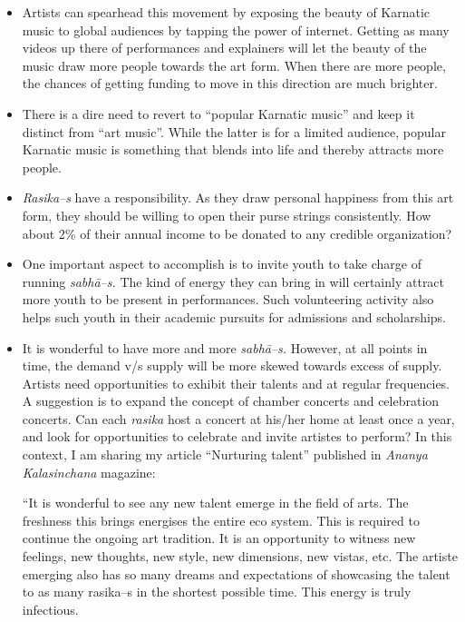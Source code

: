 \begin{itemize}
\item Artists can spearhead this movement by exposing the beauty of Karnatic music to global audiences by tapping the power of internet. Getting as many videos up there of performances and explainers will let the beauty of the music draw more people towards the art form. When there are more people, the chances of getting funding to move in this direction are much brighter.

 \item There is a dire need to revert to “popular Karnatic music” and keep it distinct from “art music”. While the latter is for a limited audience, popular Karnatic music is something that blends into life and thereby attracts more people.

 \item \textit{Rasika–s} have a responsibility. As they draw personal happiness from this art form, they should be willing to open their purse strings consistently. How about 2\% of their annual income to be donated to any credible organization?

 \item One important aspect to accomplish is to invite youth to take charge of running \textit{sabhā–s.} The kind of energy they can bring in will certainly attract more youth to be present in performances. Such volunteering activity also helps such youth in their academic pursuits for admissions and scholarships.

 \item 
 It is wonderful to have more and more \textit{sabhā–s.} However, at all points in time, the demand v/s supply will be more skewed towards excess of supply. Artists need opportunities to exhibit their talents and at regular frequencies. A suggestion is to expand the concept of chamber concerts and celebration concerts. Can each \textit{rasika} host a concert at his/her home at least once a year, and look for opportunities to celebrate and invite artistes to perform? In this context, I am sharing my article “Nurturing talent” published in \textit{Ananya Kalasinchana} magazine:

\begin{myquote}
“It is wonderful to see any new talent emerge in the field of arts. The freshness this brings energises the entire eco system. This is required to continue the ongoing art tradition. It is an opportunity to witness new feelings, new thoughts, new style, new dimensions, new vistas, etc. The artiste emerging also has so many dreams and expectations of showcasing the talent to as many rasika–s in the shortest possible time. This energy is truly infectious.
\end{myquote}


\end{itemize}

